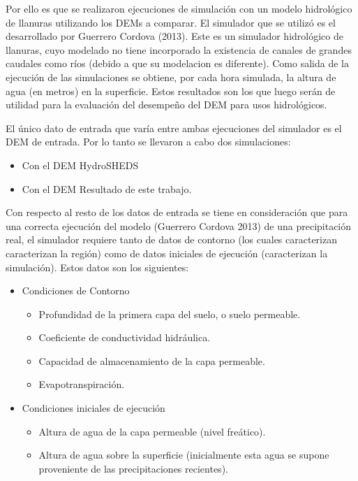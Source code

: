 \documentclass[10pt,a4paper, twoside]{report}
\begin{document}
Por ello es que se realizaron ejecuciones de simulación con un modelo hidrológico de llanuras utilizando los DEMs a comparar. El simulador que se utilizó es el desarrollado por Guerrero Cordova (2013). Este es un simulador hidrológico de llanuras, cuyo modelado no tiene incorporado la existencia de canales de grandes caudales como ríos (debido a que su modelacion es diferente). Como salida de la ejecución de las simulaciones se obtiene, por cada hora simulada, la altura de agua (en metros) en la superficie. Estos resultados son los que luego serán de utilidad para la evaluación del desempeño del DEM para usos hidrológicos.

El único dato de entrada que varía entre ambas ejecuciones del simulador es el DEM de entrada. Por lo tanto se llevaron a cabo dos simulaciones:

\begin{itemize}
	\item Con el DEM HydroSHEDS
	\item Con el DEM Resultado de este trabajo.
\end{itemize}

Con respecto al resto de los datos de entrada se tiene en consideración que para una correcta ejecución del modelo (Guerrero Cordova 2013) de una precipitación real, el simulador requiere tanto de datos de contorno (los cuales caracterizan caracterizan la región) como de datos iniciales de ejecución (caracterizan la simulación). Estos datos son los siguientes:

\begin{itemize}
	\item Condiciones de Contorno
		\begin{itemize}
			\item Profundidad de la primera capa del suelo, o suelo permeable.
			\item Coeficiente de conductividad hidráulica.
			\item Capacidad de almacenamiento de la capa permeable.
			\item Evapotranspiración.			
		\end{itemize}
	\item Condiciones iniciales de ejecución
		\begin{itemize}
			\item Altura de agua de la capa permeable (nivel freático).
			\item Altura de agua sobre la superficie (inicialmente esta agua se supone proveniente de las precipitaciones recientes).
		\end{itemize}
\end{itemize}
\end{document}
